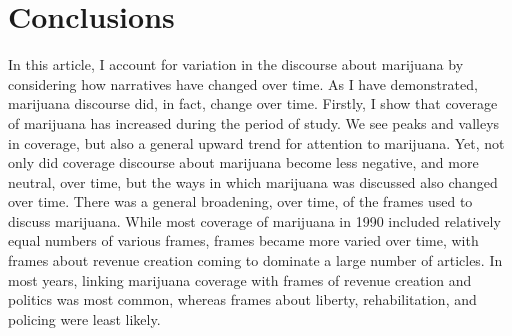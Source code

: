 
\section{Conclusions} 

In this article, I account for variation in the discourse about marijuana by considering how narratives have changed over time. As I have demonstrated, marijuana discourse did, in fact, change over time. Firstly, I show that coverage of marijuana has increased during the period of study. We see peaks and valleys in coverage, but also a general upward trend for attention to marijuana. Yet, not only did coverage discourse about marijuana become less negative, and more neutral, over time, but the ways in which marijuana was discussed also changed over time. There was a general broadening, over time, of the frames used to discuss marijuana. While most coverage of marijuana in 1990 included relatively equal numbers of various frames, frames became more varied over time, with frames about revenue creation coming to dominate a large number of articles. In most years, linking marijuana coverage with frames of revenue creation and politics was most common, whereas frames about liberty, rehabilitation, and policing were least likely. %

